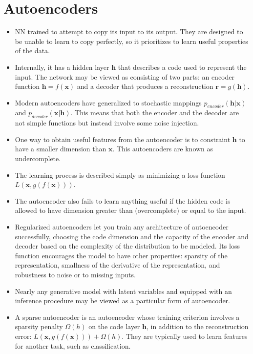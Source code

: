 \documentclass{article}
\begin{document}
\section{Autoencoders}
\begin{itemize}
\item NN trained to attempt to copy its input to its output. They are designed to be unable to learn to copy perfectly, so it prioritizes to learn useful properties of the data.
\item Internally, it has a hidden layer \(\boldsymbol{h}\) that describes a code used to represent the input. The network may be viewed as consisting of two parts: an encoder function \(\boldsymbol{h}=f(\boldsymbol{x})\) and a decoder that produces a reconstruction \(\boldsymbol{r} = g(\boldsymbol{h})\).
\item Modern autoencoders have generalized to stochastic mappings \(p_{encoder}(\boldsymbol{h}|\boldsymbol{x})\) and \(p_{decoder}(\boldsymbol{x}|\boldsymbol{h})\). This means that both the encoder and the decoder are not simple functions but instead involve some noise injection.
\item One way to obtain useful features from the autoencoder is to constraint \(\boldsymbol{h}\) to have a smaller dimension than \(\boldsymbol{x}\). This autoencoders are known as undercomplete.
\item The learning process is described simply as minimizing a loss function \(L(\boldsymbol{x}, g(f(\boldsymbol{x})))\).
\item The autoencoder also fails to learn anything useful if the hidden code is allowed to have dimension greater than (overcomplete) or equal to the input.
\item Regularized autoencoders let you train any architecture of autoencoder successfully, choosing the code dimension and the capacity of the encoder and decoder based on the complexity of the distribution to be modeled. Its loss function encourages the model to have other properties: sparsity of the representation, smallness of the derivative of the representation, and robustness to noise or to missing inputs.
\item Nearly any generative model with latent variables and equipped with an inference procedure may be viewed as a particular form of autoencoder.
\item A sparse autoencoder is an autoencoder whose training criterion involves a sparsity penalty \(\Omega(h)\) on the code layer \(\boldsymbol{h}\), in addition to the reconstruction error: \(L(\boldsymbol{x}, g(f(\boldsymbol{x}))) + \Omega(h)\). They are typically used to learn features for another task, such as classification.

\end{itemize}
\end{document}
